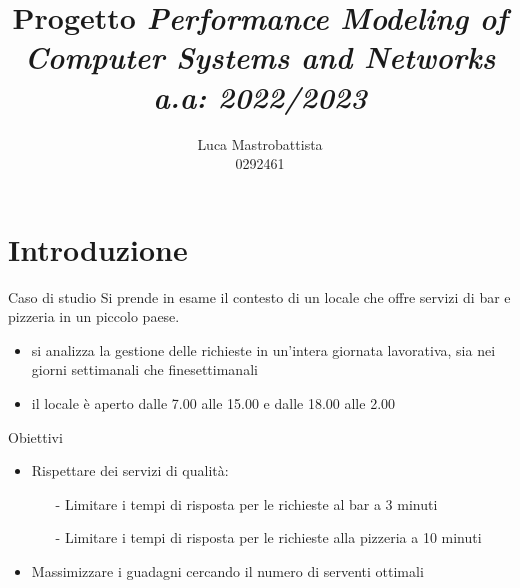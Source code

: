 \documentclass[xcolor=table]{beamer}
\begin{document}
\addtocounter{framenumber}{1}

\title{Progetto \textit{Performance Modeling of Computer Systems and Networks\\a.a: 2022/2023}}
\author{Luca Mastrobattista\\0292461}
\date{}
\begin{frame}[c,noframenumbering]
\titlepage

\end{frame}

\section{Introduzione}
\begin{frame}{Caso di studio}
\justifying
Si prende in esame il contesto di un locale che offre servizi di bar e pizzeria in un piccolo paese.
\begin{itemize}
\item si analizza la gestione delle richieste in un'intera giornata lavorativa, sia nei giorni settimanali che finesettimanali

\item il locale è aperto dalle 7.00 alle 15.00 e dalle 18.00 alle 2.00

\end{itemize}
\end{frame}



\begin{frame}{Obiettivi}
\begin{itemize}
\item Rispettare dei servizi di qualità:
\begin{itemize}
\item[-] Limitare i tempi di risposta per le richieste al bar a 3 minuti
\item[-] Limitare i tempi di risposta per le richieste alla pizzeria a 10 minuti
\end{itemize}

\item Massimizzare i guadagni cercando il numero di serventi ottimali 
\end{itemize}
\end{frame}
\end{document}
